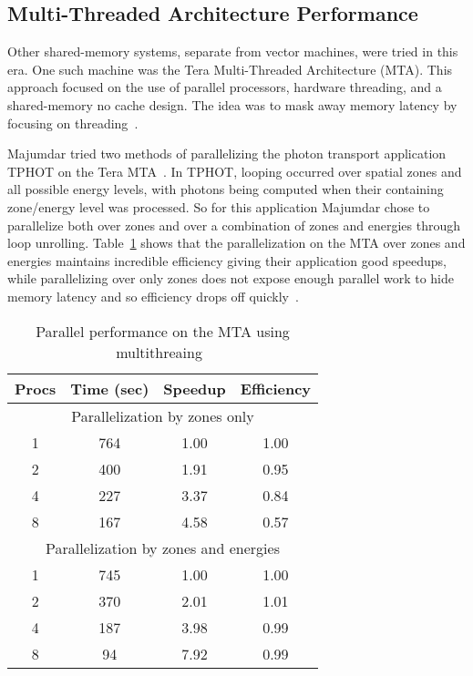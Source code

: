 \subsection*{Multi-Threaded Architecture Performance}

%
Other shared-memory systems, separate from vector machines, were tried in this era.
%
One such machine was the Tera Multi-Threaded Architecture (MTA).
%
This approach focused on the use of parallel processors, hardware threading, and a shared-memory no cache design.
%
The idea was to mask away memory latency by focusing on threading~\cite{majumdar2000parallel, snavely1998multi}.
%

%
Majumdar tried two methods of parallelizing the photon transport application TPHOT on the Tera MTA~\cite{majumdar2000parallel}. 
%
In TPHOT, looping occurred over spatial zones and all possible energy levels, with photons being computed when their containing zone/energy level was processed.
%
So for this application Majumdar chose to parallelize both over zones and over a combination of zones and energies through loop unrolling.
%
Table~\ref{tab:MTAPerf} shows that the parallelization on the MTA over zones and energies maintains incredible efficiency giving their application good speedups, while parallelizing over only zones does not expose enough parallel work to hide memory latency and so efficiency drops off quickly~\cite{majumdar2000parallel}.
%
\begin{table}
\caption {Parallel performance on the MTA using multithreaing~\cite{majumdar2000parallel}} \label{tab:MTAPerf} 
\begin{center}
\begin{tabular}{|c|c|c|c|}
\hline
Procs & Time (sec) & Speedup & Efficiency \\
\hline
\multicolumn{4}{|c|}{Parallelization by zones only} \\
\hline
1 & 764 & 1.00 & 1.00 \\
\hline
2 & 400 & 1.91 & 0.95 \\
\hline
4 & 227 & 3.37 & 0.84 \\
\hline
8 & 167 & 4.58 & 0.57 \\
\hline
\multicolumn{4}{|c|}{Parallelization by zones and energies} \\
\hline
1 & 745 & 1.00 & 1.00 \\
\hline
2 & 370 & 2.01 & 1.01 \\
\hline
4 & 187 & 3.98 & 0.99 \\
\hline
8 & 94 & 7.92 & 0.99 \\
\hline
\end{tabular}
\end{center}
\end{table}

